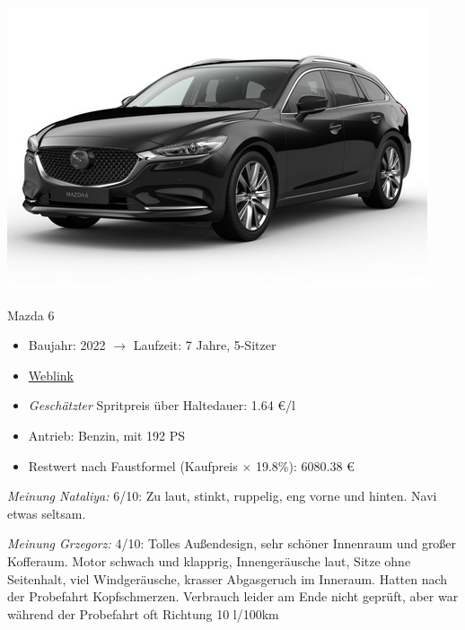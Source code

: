 \documentclass[landscape, DIV=99, 14pt]{scrartcl}
\begin{document}
\pagebreak
\begin{center}
\includegraphics[width=0.9\columnwidth]{cars/mazda-6-neu.png}

Mazda 6
\end{center}

\begin{itemize}
    \item Baujahr: 2022 $\rightarrow$ Laufzeit: 7 Jahre, 5-Sitzer
    \item \href{https://konfigurator.meinauto.de/mazda/neuwagen/48-6/angebote/6-kombi/konfigurator/\#!/extras/exclusive-line/8846370/10,11/private/65352-5416-204698/984/61c9aa657e74c/cash-purchase/32545--287374/48,0,10000,0,0,0,0,0,}{Weblink}
    \item \emph{Gesch\"atzter} Spritpreis \"uber Haltedauer: 1.64 \euro{}/l
    \item Antrieb: Benzin, mit 192 PS
    \item Restwert nach Faustformel (Kaufpreis $\times$ 19.8\%): 6080.38 \euro{}
\end{itemize}

\begin{small}
\emph{Meinung Nataliya:} 6/10: Zu laut, stinkt, ruppelig, eng vorne und hinten. Navi etwas seltsam.
        
\emph{Meinung Grzegorz:} 4/10: Tolles Au\ss{}endesign, sehr sch\"oner Innenraum und gro\ss{}er Kofferaum. Motor schwach und klapprig, Innenger\"ausche laut, Sitze ohne Seitenhalt, viel Windger\"ausche, krasser Abgasgeruch im Inneraum. Hatten nach der Probefahrt Kopfschmerzen. Verbrauch leider am Ende nicht gepr\"uft, aber war w\"ahrend der Probefahrt oft Richtung 10 l/100km
\end{small}

\pagebreak
\end{document}
